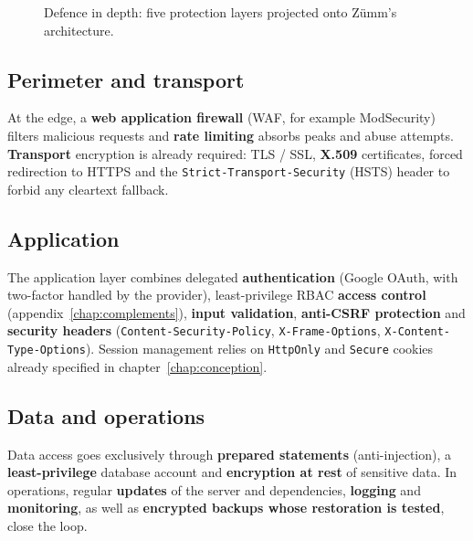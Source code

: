 \begin{figure}[htbp]
\centering
{}
\caption{Defence in depth: five protection layers projected onto Zümm's architecture.}
\label{fig:secu-couches}
\end{figure}

\subsection{Perimeter and transport}
At the edge, a \textbf{web application firewall} (WAF, for example ModSecurity)
filters malicious requests and \textbf{rate limiting} absorbs peaks and abuse
attempts. \textbf{Transport} encryption is already required: TLS / SSL,
\textbf{X.509} certificates, forced redirection to HTTPS and the
\texttt{Strict-Transport-Security} (HSTS) header to forbid any cleartext
fallback.

\subsection{Application}
The application layer combines delegated \textbf{authentication} (Google OAuth,
with two-factor handled by the provider), least-privilege RBAC \textbf{access
control} (appendix~\ref{chap:complements}), \textbf{input validation},
\textbf{anti-CSRF protection} and \textbf{security headers}
(\texttt{Content-Security-Policy}, \texttt{X-Frame-Options},
\texttt{X-Content-Type-Options}). Session management relies on \texttt{HttpOnly}
and \texttt{Secure} cookies already specified in chapter~\ref{chap:conception}.

\subsection{Data and operations}
Data access goes exclusively through \textbf{prepared statements}
(anti-injection), a \textbf{least-privilege} database account and
\textbf{encryption at rest} of sensitive data. In operations, regular
\textbf{updates} of the server and dependencies, \textbf{logging} and
\textbf{monitoring}, as well as \textbf{encrypted backups whose restoration is
tested}, close the loop.

